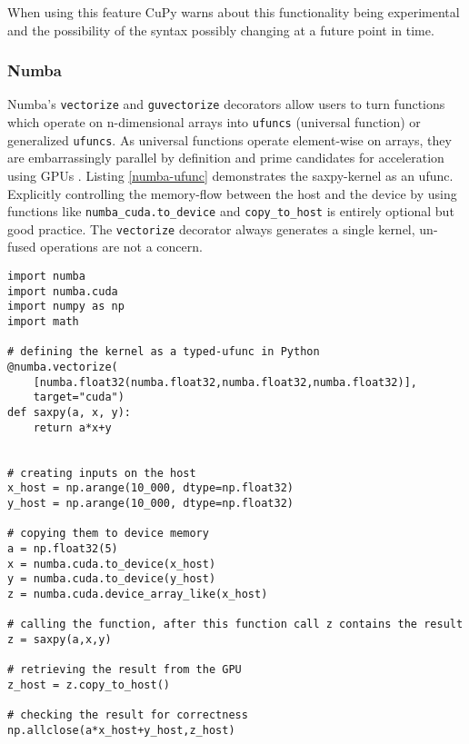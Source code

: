 \documentclass[english,11pt,a4paper,table]{article} %
\begin{document}
When using this feature CuPy warns about this functionality being experimental and the possibility of the syntax possibly changing at a future point in time.

\subsubsection{Numba}

Numba's \texttt{vectorize} and \texttt{guvectorize} decorators allow users to turn functions which operate on n-dimensional arrays into \texttt{ufuncs} (universal function) or generalized \texttt{ufuncs}.
As universal functions operate element-wise on arrays, they are embarrassingly parallel by definition and prime candidates for acceleration using GPUs \cite{Universa12:online}.
Listing \ref{numba-ufunc} demonstrates the saxpy-kernel as an ufunc.
Explicitly controlling the memory-flow between the host and the device by using functions like \texttt{numba\_cuda.to\_device} and \texttt{copy\_to\_host} is entirely optional but good practice.
The \texttt{vectorize} decorator always generates a single kernel, un-fused operations are not a concern.

\begin{verbatim}
import numba
import numba.cuda
import numpy as np
import math

# defining the kernel as a typed-ufunc in Python
@numba.vectorize(
    [numba.float32(numba.float32,numba.float32,numba.float32)],
    target="cuda")
def saxpy(a, x, y):
    return a*x+y


# creating inputs on the host
x_host = np.arange(10_000, dtype=np.float32)
y_host = np.arange(10_000, dtype=np.float32)

# copying them to device memory
a = np.float32(5)
x = numba.cuda.to_device(x_host)
y = numba.cuda.to_device(y_host)
z = numba.cuda.device_array_like(x_host)

# calling the function, after this function call z contains the result
z = saxpy(a,x,y)

# retrieving the result from the GPU
z_host = z.copy_to_host()

# checking the result for correctness
np.allclose(a*x_host+y_host,z_host)
\end{verbatim}
\end{document}
